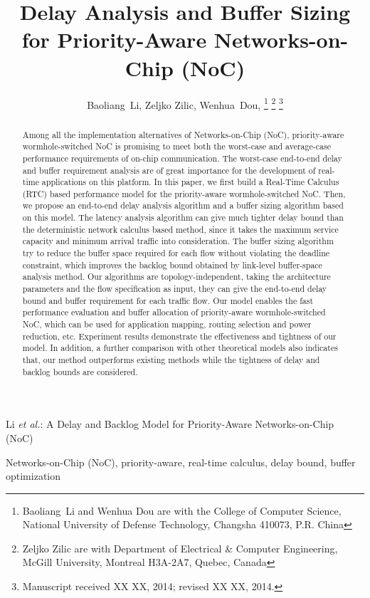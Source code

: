 \documentclass[10pt,journal]{IEEEtran}
\begin{document}
\title{Delay Analysis and Buffer Sizing for Priority-Aware Networks-on-Chip (NoC)}

\author{Baoliang~Li, %
        Zeljko Zilic, %
        Wenhua~Dou, %
\thanks{Baoliang~Li and Wenhua Dou are with the College of Computer Science, National University of Defense Technology, Changsha 410073, P.R. China}%
\thanks{Zeljko Zilic are with Department of Electrical \& Computer Engineering, McGill University, Montreal H3A-2A7, Quebec, Canada}%
\thanks{Manuscript received XX XX, 2014; revised XX XX, 2014.}}

%
{Li \MakeLowercase{\textit{et al.}}: A Delay and Backlog Model for Priority-Aware Networks-on-Chip (NoC)}

\maketitle

\begin{abstract}
Among all the implementation alternatives of Networks-on-Chip (NoC), priority-aware wormhole-switched NoC is promising to meet both the worst-case and average-case performance requirements of on-chip communication. The worst-case end-to-end delay and buffer requirement analysis are of great importance for the development of real-time applications on this platform. In this paper, we first build a Real-Time Calculus (RTC) based performance model for the priority-aware wormhole-switched NoC. Then, we propose an end-to-end delay analysis algorithm and a buffer sizing algorithm based on this model. The latency analysis algorithm can give much tighter delay bound than the deterministic network calculus based method, since it takes the maximum service capacity and minimum arrival traffic into consideration. The buffer sizing algorithm try to reduce the buffer space required for each flow without violating the deadline constraint, which improves the backlog bound obtained by link-level buffer-space analysis method. Our algorithms are topology-independent, taking the architecture parameters and the flow specification as input, they can give the end-to-end delay bound and buffer requirement for each traffic flow. Our model enables the fast performance evaluation and buffer allocation of priority-aware wormhole-switched NoC, which can be used for application mapping, routing selection and power reduction, etc. Experiment results demonstrate the effectiveness and tightness of our model. In addition, a further comparison with other theoretical models also indicates that, our method outperforms existing methods while the tightness of delay and backlog bounds are considered.
\end{abstract}
\begin{IEEEkeywords}
Networks-on-Chip (NoC), priority-aware, real-time calculus, delay bound, buffer optimization
\end{IEEEkeywords}
\end{document}
